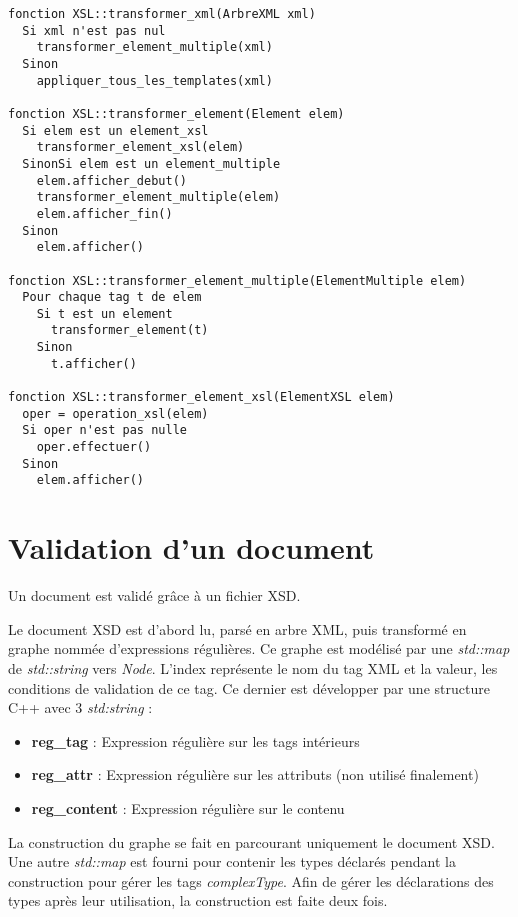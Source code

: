 \documentclass[10pt, a4paper]{article}
\begin{document}
\begin{verbatim}
fonction XSL::transformer_xml(ArbreXML xml)
  Si xml n'est pas nul
    transformer_element_multiple(xml)
  Sinon
    appliquer_tous_les_templates(xml)

fonction XSL::transformer_element(Element elem)
  Si elem est un element_xsl
    transformer_element_xsl(elem)
  SinonSi elem est un element_multiple
    elem.afficher_debut()
    transformer_element_multiple(elem)
    elem.afficher_fin()
  Sinon
    elem.afficher()

fonction XSL::transformer_element_multiple(ElementMultiple elem)
  Pour chaque tag t de elem
    Si t est un element
      transformer_element(t)
    Sinon
      t.afficher()

fonction XSL::transformer_element_xsl(ElementXSL elem)
  oper = operation_xsl(elem)
  Si oper n'est pas nulle
    oper.effectuer()
  Sinon
    elem.afficher()
\end{verbatim}

\section{Validation d'un document}\label{validation-dun-document}

Un document est validé grâce à un fichier XSD.

Le document XSD est d'abord lu, parsé en arbre XML, puis transformé en
graphe nommée d'expressions régulières. Ce graphe est modélisé par une
\emph{std::map} de \emph{std::string} vers \emph{Node}. L'index
représente le nom du tag XML et la valeur, les conditions de validation
de ce tag. Ce dernier est développer par une structure C++ avec 3
\emph{std:string} :

\begin{itemize}
\itemsep1pt\parskip0pt
\item
  \textbf{reg\_tag} : Expression régulière sur les tags intérieurs
\item
  \textbf{reg\_attr} : Expression régulière sur les attributs (non
  utilisé finalement)
\item
  \textbf{reg\_content} : Expression régulière sur le contenu
\end{itemize}

La construction du graphe se fait en parcourant uniquement le document
XSD. Une autre \emph{std::map} est fourni pour contenir les types
déclarés pendant la construction pour gérer les tags \emph{complexType}.
Afin de gérer les déclarations des types après leur utilisation, la
construction est faite deux fois. \\
\end{document}
